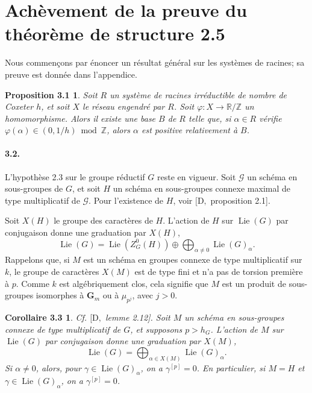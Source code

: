 \documentclass[11pt]{article}
\newcommand{\Lie}{\operatorname{Lie}}
\newtheorem*{proposition31}{Proposition 3.1}
\newtheorem*{corollaire33}{Corollaire 3.3}
\newcommand{\Gm}{\mathbf G_m}
\begin{document}
\section{Achèvement de la preuve du théorème de structure 2.5}

Nous commençons par énoncer un résultat général sur les systèmes de racines; sa preuve
est donnée dans l'appendice.

\begin{proposition31}
Soit \(R\) un système de racines irréductible de nombre de Coxeter \(h\), et soit \(X\)
le réseau engendré par \(R\). Soit \(\varphi:X\to\mathbb R/\mathbb Z\) un homomorphisme.
Alors il existe une base \(B\) de \(R\) telle que, si \(\alpha\in R\) vérifie
\(\varphi(\alpha)\in(0,1/h)\bmod\mathbb Z\), alors \(\alpha\) est positive relativement
à \(B\).
\end{proposition31}

\paragraph{3.2.}
L'hypothèse 2.3 sur le groupe réductif \(G\) reste en vigueur. Soit \(\mathcal G\) un
schéma en sous-groupes de \(G\), et soit \(H\) un schéma en sous-groupes connexe maximal
de type multiplicatif de \(\mathcal G\). Pour l'existence de \(H\), voir
\([\mathrm D,\) proposition 2.1].

Soit \(X(H)\) le groupe des caractères de \(H\). L'action de \(H\) sur \(\Lie(G)\) par
conjugaison donne une graduation par \(X(H)\),
\[
  \Lie(G)=\Lie(Z^0_G(H))\oplus\bigoplus_{\alpha\ne0}\Lie(G)_\alpha.
\]
Rappelons que, si \(M\) est un schéma en groupes connexe de type multiplicatif sur
\(k\), le groupe de caractères \(X(M)\) est de type fini et n'a pas de torsion première à
\(p\). Comme \(k\) est algébriquement clos, cela signifie que \(M\) est un produit de
sous-groupes isomorphes à \(\Gm\) ou à \(\mu_{p^j}\), avec \(j>0\).

\begin{corollaire33}
Cf. \([\mathrm D,\) lemme 2.12]. Soit \(M\) un schéma en sous-groupes connexe de type
multiplicatif de \(G\), et supposons \(p>h_G\). L'action de \(M\) sur \(\Lie(G)\) par
conjugaison donne une graduation par \(X(M)\),
\[
  \Lie(G)=\bigoplus_{\alpha\in X(M)}\Lie(G)_\alpha.
\]
Si \(\alpha\ne0\), alors, pour \(\gamma\in\Lie(G)_\alpha\), on a \(\gamma^{[p]}=0\). En
particulier, si \(M=H\) et \(\gamma\in\Lie(G)_\alpha\), on a \(\gamma^{[p]}=0\).
\end{corollaire33}
\end{document}
